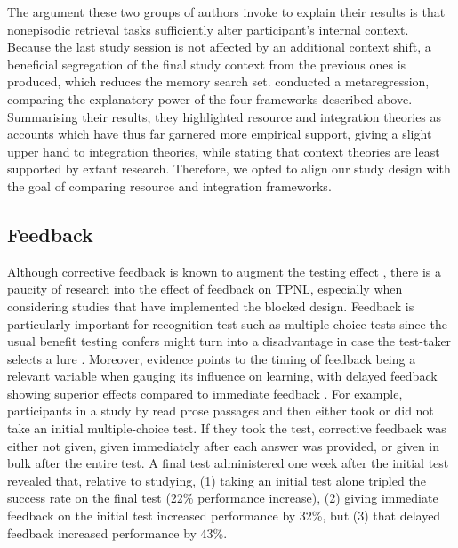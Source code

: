 \documentclass[../main.tex]{subfiles}
\begin{document}
The argument these two groups of authors invoke to explain their results is that nonepisodic retrieval tasks sufficiently alter participant's internal context. Because the last study session is not affected by an additional context shift, a beneficial segregation of the final study context from the previous ones is produced, which reduces the memory search set. \cite{chanRetrievalPotentiatesNew2018} conducted a metaregression, comparing the explanatory power of the four frameworks described above. Summarising their results, they highlighted resource and integration theories as accounts which have thus far garnered more empirical support, giving a slight upper hand to integration theories, while stating that context theories are least supported by extant research. Therefore, we opted to align our study design with the goal of comparing resource and integration frameworks.

\hypertarget{feedback}{%
\subsection{Feedback}}

Although corrective feedback is known to augment the testing effect \citep{roedigeriiiCriticalRoleRetrieval2011}, there is a paucity of research into the effect of feedback on TPNL, especially when considering studies that have implemented the  blocked design. Feedback is particularly important for recognition test such as multiple-choice tests since the usual benefit testing confers might turn into a disadvantage in case the test-taker selects a lure \citep{roedigerPositiveNegativeConsequences2005, marshMemorialConsequencesMultiplechoice2007}. Moreover, evidence points to the timing of feedback being a relevant variable when gauging its influence on learning, with delayed feedback showing superior effects compared to immediate feedback \citep{metcalfeDelayedImmediateFeedback2009,butlerEffectTypeTiming2007, butlerFeedbackEnhancesPositive2008,smithLearningFeedbackSpacing2010}. For example, participants in a study by \cite{butlerFeedbackEnhancesPositive2008} read prose passages and then either took or did not take an initial multiple-choice test. If they took the test, corrective feedback was either not given, given immediately after each answer was provided, or given in bulk after the entire test. A final test administered one week after the initial test revealed that, relative to studying, (1) taking an initial test alone tripled the success rate on the final test (22\% performance increase), (2) giving immediate feedback on the initial test increased performance by 32\%, but (3) that delayed feedback increased performance by 43\%.
\end{document}
